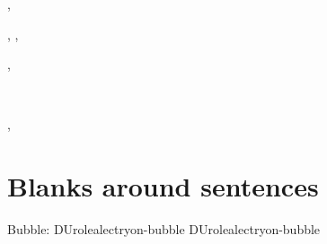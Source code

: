 \documentclass[a4paper]{article}
\providecommand*{\DUrole}[2]{%
  \ifcsname DUrole#1\endcsname%
    \csname DUrole#1\endcsname{#2}%
  \else%
    #2%
  \fi%
}
\begin{document}
\begin{alectryon}
  \sep
  \begin{sentence}
    \begin{output}
      \begin{goals}
        \begin{goal}
          \begin{hyps}\end{hyps}
          \sep
          \infrule{}
          \sep
          \begin{conclusion}
          \end{conclusion}
        \end{goal}
      \end{goals}
    \end{output}
  \end{sentence}
  \sep
  \begin{sentence}
    \begin{input}
      ~~
    \end{input}
  \end{sentence}
  \sep
  \begin{sentence}
    \begin{input}
    \end{input}
  \end{sentence}
\end{alectryon}


\section{Blanks around sentences%
  \label{blanks-around-sentences}%
}

Bubble: \DUrole{alectryon-bubble}{}
\end{document}
